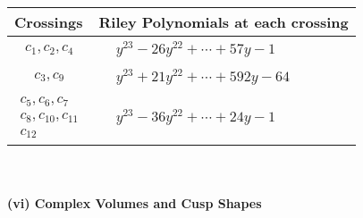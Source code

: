\documentclass[1p]{elsarticle_modified}
\theoremstyle{definition}
\begin{document}
\begin{tabular}{m{50pt}|m{274pt}}
Crossings & \hspace{64pt}Riley Polynomials at each crossing \\
\hline $$\begin{aligned}c_{1},c_{2},c_{4}\end{aligned}$$&$\begin{aligned}
&y^{23}-26 y^{22}+\cdots+57 y-1
\end{aligned}$\\
\hline $$\begin{aligned}c_{3},c_{9}\end{aligned}$$&$\begin{aligned}
&y^{23}+21 y^{22}+\cdots+592 y-64
\end{aligned}$\\
\hline $$\begin{aligned}c_{5},c_{6},c_{7}\\c_{8},c_{10},c_{11}\\c_{12}\end{aligned}$$&$\begin{aligned}
&y^{23}-36 y^{22}+\cdots+24 y-1
\end{aligned}$\\
\hline
\end{tabular}\\~\\
\newpage\flushleft \textbf{(vi) Complex Volumes and Cusp Shapes}
\end{document}
